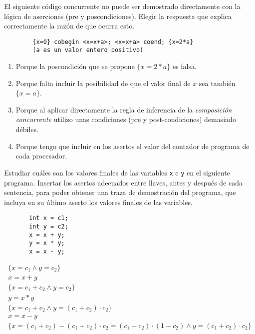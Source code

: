\begin{ejercicio}
    El siguiente código concurrente no puede ser demostrado directamente con la lógica de aserciones (pre y poscondiciones). Elegir la respuesta que explica correctamente la razón de que ocurra esto.
    \begin{verbatim}
        {x=0} cobegin <x=x+a>; <x=x+a> coend; {x=2*a}
        (a es un valor entero positivo)
    \end{verbatim}
    \begin{enumerate}[label=(\alph*)]
        \item Porque la poscondición que se propone $\{x=2\ast a\}$ es falsa.
        \item Porque falta incluir la posibilidad de que el valor final de $x$ sea también ${\{x=a\}}$.
        \item Porque al aplicar directamente la regla de inferencia de la \textit{composición concurrente} utilizo unas condiciones (pre y post-condiciones) demasiado débiles.
        \item Porque tengo que incluir en los asertos el valor del contador de programa de cada procesador.
    \end{enumerate}
\end{ejercicio}

\begin{ejercicio}
   Estudiar cuáles son los valores finales de las variables \verb|x| e \verb|y| en el siguiente programa. Insertar los asertos adecuados entre llaves, antes y después de cada sentencia, para poder obtener una traza de demostración del programa, que incluya en su último aserto los valores finales de las variables. 
   \begin{verbatim}
       int x = c1;
       int y = c2;
       x = x + y;
       y = x * y;
       x = x - y;
   \end{verbatim}

   \begin{gather*}
       \{x = c_1 \land y = c_2\}\\
       x = x + y \\
       \{x = c_1 + c_2 \land y =c_2\} \\
       y = x * y \\
       \{x = c_1 + c_2 \land y = (c_1 + c_2)\cdot c_2 \} \\
       x = x - y \\
       \{x = (c_1 + c_2) - (c_1 + c_2)\cdot c_2 = (c_1 + c_2)\cdot (1-c_2) \land y = (c_1 + c_2)\cdot c_2 \}
   \end{gather*}
\end{ejercicio}

